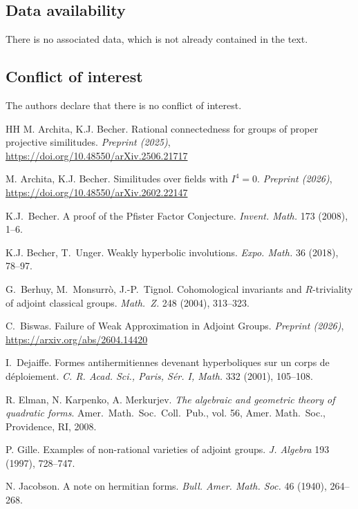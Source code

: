 \documentclass[twoside,11pt]{amsart}
\numberwithin{equation}{section}
\theoremstyle{definition}
\begin{document}
\subsection*{Data availability}
There is no associated data, which is not already contained in the text.

\subsection*{Conflict of interest} The authors declare that there is no conflict of interest.



\begin{thebibliography}{HH}
M. Archita, K.J. Becher. 
{Rational connectedness for groups of proper projective similitudes}. 
\emph{Preprint (2025)},
\url{https://doi.org/10.48550/arXiv.2506.21717}

M. Archita, K.J. Becher. 
{Similitudes over fields with $I^4=0$}. 
\emph{Preprint (2026)},\\
\url{https://doi.org/10.48550/arXiv.2602.22147}

K.J.~Becher.
A proof of the Pfister Factor Conjecture. \emph{Invent. Math.} 173 (2008), 1--6.

 K.J. Becher, T.~Unger. Weakly hyperbolic involutions. 
\emph{Expo. Math.} 36 (2018), 78--97.

 G.~Berhuy, M.~Monsurrò, J.-P.~Tignol. 
Cohomological invariants and $R$-triviality of adjoint classical groups. \emph{Math.~Z.} 248 (2004), 313--323.

C.~Biswas.
Failure of Weak Approximation in Adjoint Groups.
\emph{Preprint (2026)},\\
\url{https://arxiv.org/abs/2604.14420}

I.~Dejaiffe.
Formes antihermitiennes devenant hyperboliques sur un corps de
d\'eploiement. \emph{C. R. Acad. Sci., Paris, S\'er. I, Math.} 332 (2001), 105--108.

R. Elman, N. Karpenko, A. Merkurjev. 
{\em The algebraic and geometric theory of quadratic forms}. 
Amer.~Math.~Soc.~Coll.~Pub., vol. {56}, Amer. Math.~Soc., Providence, RI, 2008.

P. Gille. Examples of non-rational varieties of adjoint groups. \emph{J. Algebra} {193} (1997), 728--747.

N. Jacobson. A note on hermitian forms.
\emph{Bull. Amer. Math. Soc.} 46 (1940), 264--268.


\end{thebibliography}
\end{document}
